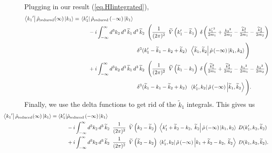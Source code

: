 Plugging in our result (\ref{eq.HIintegrated}),
\begin{align*}
\left\langle{k_1}^\prime\right|\hat{\rho}_\text{reduced}(\infty)\left|k_1\right\rangle
=\hspace{1.7em}&\hspace{-1.5em}
\left\langle k_1^\prime\right|\hat{\rho}_\text{reduced}\left(-\infty\right)\left|k_1\right\rangle
\\&-  i \int_{-\infty}^\infty d^3k_2 \,d^3\,\widetilde{k}_1\,d^3\,\widetilde{k}_2 \;\;{\Bigg(}\frac{1}{(2\pi)^2}\; \;\widetilde{V}\left(k_1^\prime - \widetilde{k}_1\right)\;\delta\left({\textstyle\frac{{k_1^\prime}^2}{2m_1} + \frac{{k_2}^2}{2m_2} - \frac{{\widetilde{k}_1}^2}{2m_1} - \frac{{\widetilde{k}_2}^2}{2m_2}}\right) \\&\hspace{9em}\delta^3(k_1^\prime - \widetilde{k}_1 - k_2 + \widetilde{k}_2)    \;\;\left\langle\widetilde{k}_1, \widetilde{k}_2\right|\hat{\rho}\left(-\infty\right)\left|k_1, k_2\right\rangle{\Bigg)}
\\&+  i \int_{-\infty}^\infty d^3k_2 \,d^3\,\widetilde{k}_1\,d^3\,\widetilde{k}_2 \;\;{\Bigg(}\frac{1}{(2\pi)^2}\; \;\widetilde{V}\left(\widetilde{k}_1 - {k}_1\right)\;\delta\left({\textstyle\frac{{\widetilde{k}_1}^2}{2m_1} + \frac{{\widetilde{k}_2}^2}{2m_2} - \frac{{{k}_1}^2}{2m_1} - \frac{{{k}_2}^2}{2m_2}}\right) \\&\hspace{9em}\delta^3(\widetilde{k}_1 - {k}_1 - \widetilde{k}_2 + {k}_2)    \;\;\left\langle{k}_1^\prime, {k}_2\right|\hat{\rho}\left(-\infty\right)\left|\widetilde{k}_1, \widetilde{k}_2\right\rangle{\Bigg)}.
\end{align*}
Finally, we use the delta functions to get rid of the \(\widetilde{k}_1\) integrals. This gives us
\begin{align*}
\hspace{-4em}\bra{{k_1}^\prime}\op{\rho}_\text{reduced}(\infty)\ket{k_1}
= 
\bra{k_1^\prime}&\op{\rho}_\text{reduced}\left(-\infty\right)\ket{k_1} \\
&-  i \int_{-\infty}^\infty d^3k_2 \,d^3\,\widetilde{k}_2 \;\;\frac{1}{(2\pi)^2}\; \;\widetilde{V}\left(k_2 - 
\widetilde{k}_2\right)\; \bra{k_1^\prime + \widetilde{k}_2 - k_2,\; \widetilde{k}_2}\op{\rho}\left(-\infty\right)\ket{k_1, k_2} \;D(k_1^\prime, k_2, \widetilde{k}_2)
\nonumber\\&+  i \int_{-\infty}^\infty d^3k_2 \,d^3\,\widetilde{k}_2 \;\;\frac{1}{(2\pi)^2}\; \;\widetilde{V}\left(\widetilde{k}_2 - 
{k}_2\right)\; \bra{{k}_1^\prime, {k}_2}\op{\rho}\left(-\infty\right)\ket{k_1 + \widetilde{k}_2 - k_2,\; \widetilde{k}_2} \;D(k_1, k_2, \widetilde{k}_2). \nonumber
\end{align*}
